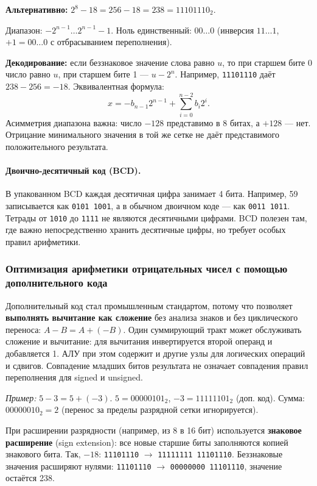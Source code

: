 \textbf{Альтернативно:} $2^8 - 18 = 256 - 18 = 238 = 11101110_2$.

Диапазон: $-2^{n-1} \dots 2^{n-1}-1$. Ноль единственный: $00\dots0$ (инверсия $11\dots1$, $+1 = 00\dots0$ с отбрасыванием переполнения).

\textbf{Декодирование:} если беззнаковое значение слова равно $u$, то
при старшем бите 0 число равно $u$, при старшем бите 1 --- $u-2^n$.
Например, \texttt{11101110} даёт $238-256=-18$.
Эквивалентная формула:
\[
x=-b_{n-1}2^{n-1}+\sum_{i=0}^{n-2}b_i2^i.
\]
Асимметрия диапазона важна: число $-128$ представимо в 8 битах,
а $+128$ --- нет. Отрицание минимального значения в той же сетке
не даёт представимого положительного результата.

\paragraph{Двоично-десятичный код (BCD).}
В упакованном BCD каждая десятичная цифра занимает 4 бита.
Например, 59 записывается как \texttt{0101 1001}, а в обычном двоичном
коде --- как \texttt{0011 1011}. Тетрады от \texttt{1010} до \texttt{1111}
не являются десятичными цифрами. BCD полезен там, где важно
непосредственно хранить десятичные цифры, но требует особых правил арифметики.

\subsubsection{Оптимизация арифметики отрицательных чисел с помощью дополнительного кода}
Дополнительный код стал промышленным стандартом, потому что позволяет \textbf{выполнять вычитание как сложение} без анализа знаков и без циклического переноса:
$A - B = A + (-B)$.
Один суммирующий тракт может обслуживать сложение и вычитание:
для вычитания инвертируется второй операнд и добавляется 1.
АЛУ при этом содержит и другие узлы для логических операций и сдвигов.
Совпадение младших битов результата не означает совпадения правил
переполнения для signed и unsigned.

\textit{Пример:} $5 - 3 = 5 + (-3)$. $5=00000101_2$, $-3=11111101_2$ (доп. код). Сумма: $00000010_2 = 2$ (перенос за пределы разрядной сетки игнорируется).

При расширении разрядности (например, из 8 в 16 бит) используется \textbf{знаковое расширение} (sign extension): все новые старшие биты заполняются копией знакового бита.
Так, $-18$: \texttt{11101110} $\to$ \texttt{11111111 11101110}.
Беззнаковые значения расширяют нулями: \texttt{11101110} $\to$
\texttt{00000000 11101110}, значение остаётся 238.

